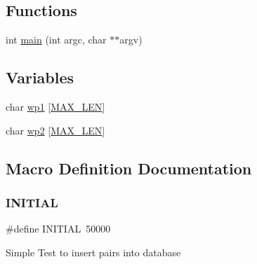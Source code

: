 \subsection*{Functions}
\begin{DoxyCompactItemize}
\item 
int \mbox{\hyperlink{adat-devel_2other__libs_2filedb_2filehash_2tcreate_8c_a3c04138a5bfe5d72780bb7e82a18e627}{main}} (int argc, char $\ast$$\ast$argv)
\end{DoxyCompactItemize}
\subsection*{Variables}
\begin{DoxyCompactItemize}
\item 
char \mbox{\hyperlink{adat-devel_2other__libs_2filedb_2filehash_2tcreate_8c_ae2b9e201e27e242b57e2ff99dff6d28a}{wp1}} \mbox{[}\mbox{\hyperlink{adat__devel_2other__libs_2filedb_2filehash_2twrite_8c_aabf4f709c8199e41cf279c77112345fe}{M\+A\+X\+\_\+\+L\+EN}}\mbox{]}
\item 
char \mbox{\hyperlink{adat-devel_2other__libs_2filedb_2filehash_2tcreate_8c_a54ed4cc0c9df4a27e6b33a32e3c785cc}{wp2}} \mbox{[}\mbox{\hyperlink{adat__devel_2other__libs_2filedb_2filehash_2twrite_8c_aabf4f709c8199e41cf279c77112345fe}{M\+A\+X\+\_\+\+L\+EN}}\mbox{]}
\end{DoxyCompactItemize}


\subsection{Macro Definition Documentation}
\mbox{\label{adat-devel_2other__libs_2filedb_2filehash_2tcreate_8c_aa3d063564f6ab16f6d408b8369d0e9ff}} 
\subsubsection{\texorpdfstring{INITIAL}{INITIAL}}
{\footnotesize\ttfamily \#define I\+N\+I\+T\+I\+AL~50000}

Simple Test to insert pairs into database \mbox{\label{adat-devel_2other__libs_2filedb_2filehash_2tcreate_8c_aabf4f709c8199e41cf279c77112345fe}} 
